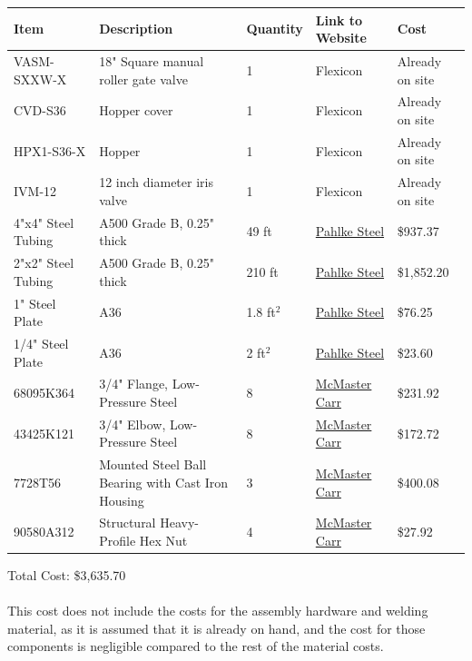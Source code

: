 \documentclass[10pt]{project}
\begin{document}
\begin{center}
\begin{tabular}{|l|l|l|l|l|}

\hline
Item & Description & Quantity & Link to Website & Cost \\
\hline
\hline
VASM-SXXW-X & 18" Square manual roller gate valve  & 1 & Flexicon & Already on site \\
\hline
CVD-S36 & Hopper cover & 1 & Flexicon & Already on site \\
\hline
 HPX1-S36-X & Hopper & 1 & Flexicon & Already on site \\
\hline
 IVM-12 & 12 inch diameter iris valve & 1 & Flexicon & Already on site \\
\hline
 4"x4" Steel Tubing & A500 Grade B, 0.25" thick & 49 ft & \href{https://www.pahlkesteel.com/}{Pahlke Steel} & \$937.37 \\
\hline
 2"x2" Steel Tubing & A500 Grade B, 0.25" thick & 210 ft & \href{https://www.pahlkesteel.com/}{Pahlke Steel} & \$1,852.20  \\
\hline
 1" Steel Plate & A36 & 1.8 ft$^2$ & \href{https://www.pahlkesteel.com/}{Pahlke Steel} & \$76.25 \\
\hline
1/4" Steel Plate & A36 & 2 ft$^2$ & \href{https://www.pahlkesteel.com/}{Pahlke Steel} & \$23.60   \\
\hline
68095K364 & 3/4" Flange, Low-Pressure Steel & 8 & \href{https://www.mcmaster.com/68095K364/}{McMaster Carr} & \$231.92   \\
\hline
43425K121 &  3/4" Elbow, Low-Pressure Steel & 8 & \href{https://www.mcmaster.com/43425K121/}{McMaster Carr} & \$172.72   \\
\hline
7728T56 & Mounted Steel Ball Bearing with Cast Iron Housing & 3 & \href{https://www.mcmaster.com/7728T56/}{McMaster Carr} & \$400.08   \\
\hline
 90580A312 & Structural Heavy-Profile Hex Nut & 4 & \href{https://www.mcmaster.com/90580A312/}{McMaster Carr} & \$27.92   \\
\hline

\end{tabular}
\end{center}


Total Cost: \$3,635.70\\\\
This cost does not include the costs for the assembly hardware and welding material, as it is assumed that it is already on hand, and the cost for those components is negligible compared to the rest of the material costs.
\end{document}
